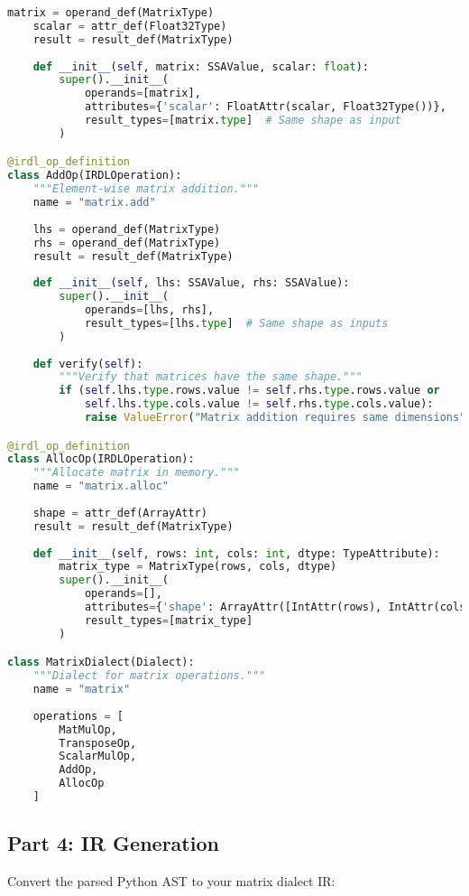 \documentclass[11pt,a4paper]{article}
\begin{document}
\begin{lstlisting}[language=Python, caption=Dialect Structure Overview]
    matrix = operand_def(MatrixType)
    scalar = attr_def(Float32Type)
    result = result_def(MatrixType)
    
    def __init__(self, matrix: SSAValue, scalar: float):
        super().__init__(
            operands=[matrix],
            attributes={'scalar': FloatAttr(scalar, Float32Type())},
            result_types=[matrix.type]  # Same shape as input
        )

@irdl_op_definition
class AddOp(IRDLOperation):
    """Element-wise matrix addition."""
    name = "matrix.add"
    
    lhs = operand_def(MatrixType)
    rhs = operand_def(MatrixType)
    result = result_def(MatrixType)
    
    def __init__(self, lhs: SSAValue, rhs: SSAValue):
        super().__init__(
            operands=[lhs, rhs],
            result_types=[lhs.type]  # Same shape as inputs
        )
    
    def verify(self):
        """Verify that matrices have the same shape."""
        if (self.lhs.type.rows.value != self.rhs.type.rows.value or
            self.lhs.type.cols.value != self.rhs.type.cols.value):
            raise ValueError("Matrix addition requires same dimensions")

@irdl_op_definition
class AllocOp(IRDLOperation):
    """Allocate matrix in memory."""
    name = "matrix.alloc"
    
    shape = attr_def(ArrayAttr)
    result = result_def(MatrixType)
    
    def __init__(self, rows: int, cols: int, dtype: TypeAttribute):
        matrix_type = MatrixType(rows, cols, dtype)
        super().__init__(
            operands=[],
            attributes={'shape': ArrayAttr([IntAttr(rows), IntAttr(cols)])},
            result_types=[matrix_type]
        )

class MatrixDialect(Dialect):
    """Dialect for matrix operations."""
    name = "matrix"
    
    operations = [
        MatMulOp,
        TransposeOp,
        ScalarMulOp,
        AddOp,
        AllocOp
    ]
\end{lstlisting}

\subsection{Part 4: IR Generation}

Convert the parsed Python AST to your matrix dialect IR:
\end{document}

